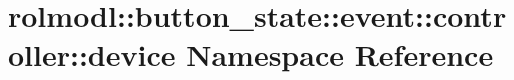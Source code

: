 \hypertarget{namespacerolmodl_1_1button__state_1_1event_1_1controller_1_1device}{}\section{rolmodl\+::button\+\_\+state\+::event\+::controller\+::device Namespace Reference}
\label{namespacerolmodl_1_1button__state_1_1event_1_1controller_1_1device}
